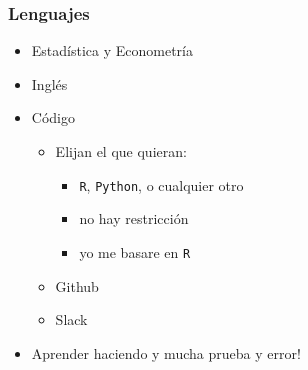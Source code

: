 \documentclass[
  shownotes,
  xcolor={svgnames},
  hyperref={colorlinks,citecolor=DarkBlue,linkcolor=andesred,urlcolor=DarkBlue}
  , aspectratio=169]{beamer}
\begin{document}
\begin{frame}
\frametitle{Lenguajes}


\begin{minipage}[t]{0.58\linewidth}
        \begin{itemize}
            \item Estadística y Econometría
           \medskip
            \item Inglés
           \medskip
            \item Código
            \begin{itemize}
              \item Elijan el que quieran: 
              \begin{itemize}
                \item \texttt{R}, \texttt{Python}, o cualquier otro
                \item no hay restricción
                \item yo me basare en \texttt{R}
                \end{itemize}
              \item Github
              \item Slack
              
            \end{itemize}
            \item Aprender haciendo y mucha prueba y error! 
            

\end{itemize}
\end{minipage}
\end{frame}
\end{document}
